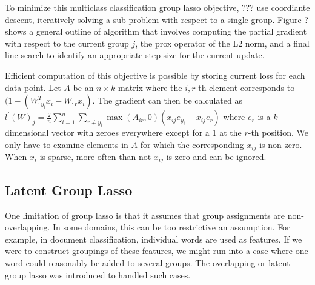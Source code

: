 \documentclass[11pt]{article}
\begin{document}
To minimize this multiclass classification group lasso objective, ??? use 
coordiante descent, iteratively solving a sub-problem with respect to a 
single group. Figure ? shows a general outline of algorithm that involves
computing the partial gradient with respect to the 
current group $j$, the prox
operator of the L2 norm, and a final line search to identify an appropriate
step size for the current update.

\begin{algorithm}
\end{algorithm}

Efficient computation of this objective is possible by storing current 
loss for each data point. Let $A$ be an $n\times k$ matrix where the 
$i,r$-th element corresponds to 
 $(1-(W_{:y_i}^Tx_i - W_{:r}x_i).$
 The gradient can then be calculated as 
 $l^\prime(W)_{j} = \frac{2}{n}\sum_{i=1}^n\sum_{r\ne y_i}
 \max(A_{ir}, 0)(x_{ij}e_{y_i} - x_{ij} e_r)$
where $e_r$ is a $k$ dimensional vector with zeroes everywhere except for a 1
at the $r$-th position. We only have to examine elements in $A$ for which 
the corresponding $x_{ij}$ is non-zero. When $x_{i}$ is sparse, more often
than not $x_{ij}$ is zero and can be ignored.



\subsection{Latent Group Lasso}

One limitation of group lasso is that it assumes that group assignments are
non-overlapping. In some domains, this can be too restrictive an assumption.
For example, in document classification, individual words are used as features.
If we were to construct groupings of these features, we might run into a case
where one word could reasonably be added to several groups. The overlapping or
latent group lasso was introduced to handled such cases.
\end{document}
